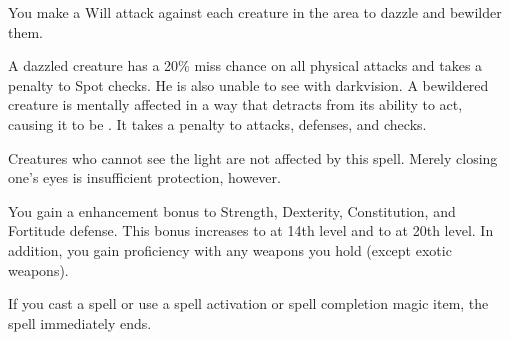 \begin{spelleffect}
  You make a Will attack against each creature in the area to dazzle and bewilder them.
\end{spelleffect}
\begin{spellnotes}
  A dazzled creature has a 20\% miss chance on all physical attacks and takes a  penalty to Spot checks. He is also unable to see with darkvision. A bewildered creature is mentally affected in a way that detracts from its ability to act, causing it to be \vulnerable. It takes a  penalty to attacks, defenses, and checks.

  Creatures who cannot see the light are not affected by this spell. Merely closing one's eyes is insufficient protection, however.
\end{spellnotes}

\spellrng{\rngpers}
\begin{spelleffect}
  You gain a  enhancement bonus to Strength, Dexterity, Constitution, and Fortitude defense. This bonus increases to  at 14th level and to  at 20th level. In addition, you gain proficiency with any weapons you hold (except exotic weapons).
\end{spelleffect}
\begin{spellnotes}
  If you cast a spell or use a spell activation or spell completion magic item, the spell immediately ends.
\end{spellnotes}

